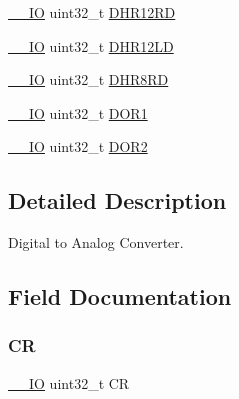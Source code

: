 \begin{DoxyCompactItemize}
\item 
\mbox{\hyperlink{core__sc300_8h_aec43007d9998a0a0e01faede4133d6be}{\+\_\+\+\_\+\+IO}} uint32\+\_\+t \mbox{\hyperlink{struct_d_a_c___type_def_a1590b77e57f17e75193da259da72095e}{D\+H\+R12\+RD}}
\item 
\mbox{\hyperlink{core__sc300_8h_aec43007d9998a0a0e01faede4133d6be}{\+\_\+\+\_\+\+IO}} uint32\+\_\+t \mbox{\hyperlink{struct_d_a_c___type_def_acc269320aff0a6482730224a4b641a59}{D\+H\+R12\+LD}}
\item 
\mbox{\hyperlink{core__sc300_8h_aec43007d9998a0a0e01faede4133d6be}{\+\_\+\+\_\+\+IO}} uint32\+\_\+t \mbox{\hyperlink{struct_d_a_c___type_def_a9590269cba8412f1be96b0ddb846ef44}{D\+H\+R8\+RD}}
\item 
\mbox{\hyperlink{core__sc300_8h_aec43007d9998a0a0e01faede4133d6be}{\+\_\+\+\_\+\+IO}} uint32\+\_\+t \mbox{\hyperlink{struct_d_a_c___type_def_aa710505be03a41981c35bacc7ce20746}{D\+O\+R1}}
\item 
\mbox{\hyperlink{core__sc300_8h_aec43007d9998a0a0e01faede4133d6be}{\+\_\+\+\_\+\+IO}} uint32\+\_\+t \mbox{\hyperlink{struct_d_a_c___type_def_aba9fb810b0cf6cbc1280c5c63be2418b}{D\+O\+R2}}
\end{DoxyCompactItemize}


\subsection{Detailed Description}
Digital to Analog Converter. 

\subsection{Field Documentation}
\mbox{\label{struct_d_a_c___type_def_ab40c89c59391aaa9d9a8ec011dd0907a}} 
\subsubsection{\texorpdfstring{CR}{CR}}
{\footnotesize\ttfamily \mbox{\hyperlink{core__sc300_8h_aec43007d9998a0a0e01faede4133d6be}{\+\_\+\+\_\+\+IO}} uint32\+\_\+t CR}

\mbox{\label{struct_d_a_c___type_def_ae9028b8bcb5118b7073165fb50fcd559}} 
